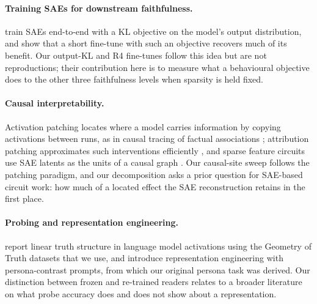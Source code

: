 \paragraph{Training SAEs for downstream faithfulness.} \citet{braun2024e2e} train SAEs end-to-end with a KL objective on
the model's output distribution, and \citet{karvonen2025kl} show that a short fine-tune with such an objective recovers
much of its benefit. Our output-KL and R4 fine-tunes follow this idea but are not reproductions; their contribution here
is to measure what a behavioural objective does to the other three faithfulness levels when sparsity is held fixed.

\paragraph{Causal interpretability.} Activation patching locates where a model carries information by copying
activations between runs, as in causal tracing of factual associations \citep{meng2022locating}; attribution patching
approximates such interventions efficiently \citep{syed2023attribution}, and sparse feature circuits use SAE latents as
the units of a causal graph \citep{marks2025sparse}. Our causal-site sweep follows the patching paradigm, and our
decomposition asks a prior question for SAE-based circuit work: how much of a located effect the SAE reconstruction
retains in the first place.

\paragraph{Probing and representation engineering.} \citet{marks2023geometry} report linear truth structure in language
model activations using the Geometry of Truth datasets that we use, and \citet{zou2023representation} introduce
representation engineering with persona-contrast prompts, from which our original persona task was derived. Our
distinction between frozen and re-trained readers relates to a broader literature on what probe accuracy does and does
not show about a representation.
